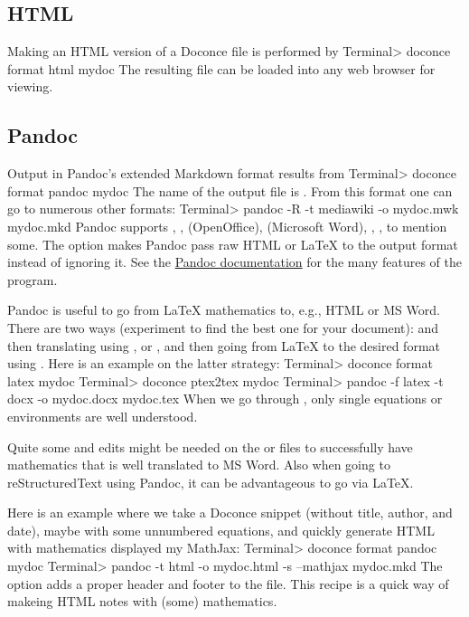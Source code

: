 \documentclass{book}
\begin{document}
\subsection{HTML}

Making an HTML version of a Doconce file 
is performed by
\bsys
Terminal> doconce format html mydoc
\esys
The resulting file  can be loaded into any web browser for viewing.

\subsection{Pandoc}

Output in Pandoc's extended Markdown format results from
\bsys
Terminal> doconce format pandoc mydoc
\esys
The name of the output file is .
From this format one can go to numerous other formats:
\bsys
Terminal> pandoc -R -t mediawiki -o mydoc.mwk mydoc.mkd
\esys
Pandoc supports , ,  (OpenOffice),  (Microsoft
Word), , , to mention some. The  option makes
Pandoc pass raw HTML or {\LaTeX} to the output format instead of ignoring it.
See the \href{{http://johnmacfarlane.net/pandoc/README.html}}{Pandoc documentation}
for the many features of the  program.

Pandoc is useful to go from {\LaTeX} mathematics to, e.g., HTML or MS Word.
There are two ways (experiment to find the best one for your document):
 and then translating using , or
, and then going from {\LaTeX} to the desired format
using .
Here is an example on the latter strategy:
\bsys
Terminal> doconce format latex mydoc
Terminal> doconce ptex2tex mydoc
Terminal> pandoc -f latex -t docx -o mydoc.docx mydoc.tex
\esys
When we go through , only single equations or 
environments are well understood.

Quite some  and  edits might be needed
on the  or  files to successfully have mathematics that is
well translated to MS Word.  Also when going to reStructuredText using
Pandoc, it can be advantageous to go via {\LaTeX}.

Here is an example where we take a Doconce snippet (without title, author,
and date), maybe with some unnumbered equations, and quickly generate
HTML with mathematics displayed my MathJax:
\bsys
Terminal> doconce format pandoc mydoc
Terminal> pandoc -t html -o mydoc.html -s --mathjax mydoc.mkd
\esys
The  option adds a proper header and footer to the  file.
This recipe is a quick way of makeing HTML notes with (some) mathematics.
\end{document}
